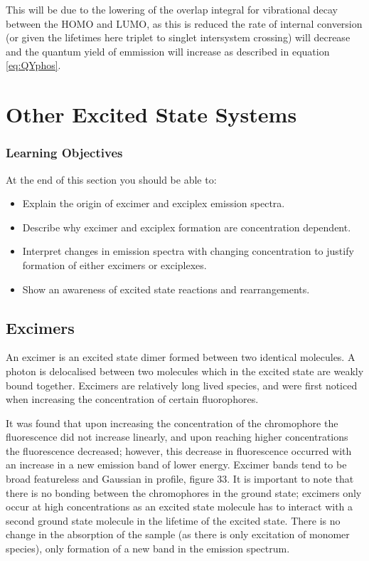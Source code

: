 \documentclass[
]{book}
\providecommand{\tightlist}{%
  \setlength{\itemsep}{0pt}\setlength{\parskip}{0pt}}
\begin{document}
This will be due to the lowering of the overlap integral for vibrational decay between the HOMO and LUMO, as this is reduced the rate of internal conversion (or given the lifetimes here triplet to singlet intersystem crossing) will decrease and the quantum yield of emmission will increase as described in equation \eqref{eq:QYphos}.

\hypertarget{ch:excited}{%
\chapter{Other Excited State Systems}\label{ch:excited}}

\hypertarget{sec:exitedLOs}{%
\subsection{Learning Objectives}\label{sec:exitedLOs}}

At the end of this section you should be able to:

\begin{itemize}
\tightlist
\item
  Explain the origin of excimer and exciplex emission spectra.
\item
  Describe why excimer and exciplex formation are concentration dependent.
\item
  Interpret changes in emission spectra with changing concentration to justify formation of either excimers or exciplexes.
\item
  Show an awareness of excited state reactions and rearrangements.
\end{itemize}

\hypertarget{sec:excimers}{%
\section{Excimers}\label{sec:excimers}}

An excimer is an excited state dimer formed between two identical molecules. A photon is delocalised between two molecules which in the excited state are weakly bound together. Excimers are relatively long lived species, and were first noticed when increasing the concentration of certain fluorophores.

It was found that upon increasing the concentration of the chromophore the fluorescence did not increase linearly, and upon reaching higher concentrations the fluorescence decreased; however, this decrease in fluorescence occurred with an increase in a new emission band of lower energy. Excimer bands tend to be broad featureless and Gaussian in profile, figure 33. It is important to note that there is no bonding between the chromophores in the ground state; excimers only occur at high concentrations as an excited state molecule has to interact with a second ground state molecule in the lifetime of the excited state. There is no change in the absorption of the sample (as there is only excitation of monomer species), only formation of a new band in the emission spectrum.
\end{document}
